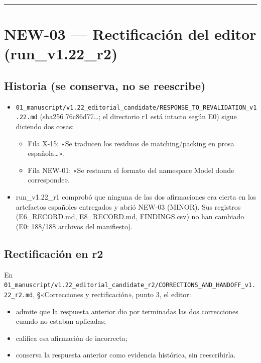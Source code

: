 \documentclass[
]{article}
\providecommand{\tightlist}{%
  \setlength{\itemsep}{0pt}\setlength{\parskip}{0pt}}
\begin{document}
\begin{center}\rule{0.5\linewidth}{0.5pt}\end{center}

\section{NEW-03 --- Rectificación del editor
(run\_v1.22\_r2)}\label{new-03--rectificaciuxf3n-del-editor-run_v122_r2}

\subsection{Historia (se conserva, no se
reescribe)}\label{historia-se-conserva-no-se-reescribe}

\begin{itemize}
\tightlist
\item
  \texttt{01\_manuscript/v1.22\_editorial\_candidate/RESPONSE\_TO\_REVALIDATION\_v1.22.md}
  (sha256 76c86d77\ldots; el directorio r1 está intacto según E0) sigue
  diciendo dos cosas:

  \begin{itemize}
  \tightlist
  \item
    Fila X-15: «Se traducen los residuos de matching/packing en prosa
    española\ldots».
  \item
    Fila NEW-01: «Se restaura el formato del namespace Model donde
    corresponde».
  \end{itemize}
\item
  run\_v1.22\_r1 comprobó que ninguna de las dos afirmaciones era cierta
  en los artefactos españoles entregados y abrió NEW-03 (MINOR). Sus
  registros (E6\_RECORD.md, E8\_RECORD.md, FINDINGS.csv) no han cambiado
  (E0: 188/188 archivos del manifiesto).
\end{itemize}

\subsection{Rectificación en r2}\label{rectificaciuxf3n-en-r2}

En
\texttt{01\_manuscript/v1.22\_editorial\_candidate\_r2/CORRECTIONS\_AND\_HANDOFF\_v1.22\_r2.md},
§«Correcciones y rectificación», punto 3, el editor:

\begin{itemize}
\tightlist
\item
  admite que la respuesta anterior dio por terminadas las dos
  correcciones cuando no estaban aplicadas;
\item
  califica esa afirmación de incorrecta;
\item
  conserva la respuesta anterior como evidencia histórica, sin
  reescribirla.
\end{itemize}
\end{document}
